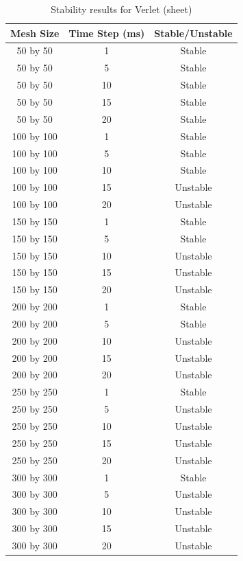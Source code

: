 \begin{table}[tp]
   \begin{minipage}{\textwidth}
      \begin{center}
         \begin{tabular}{c|c|c}
           Mesh Size & Time Step (ms) & Stable/Unstable\\
           \hline
           50 by 50 & 1 & Stable\\
           50 by 50 & 5 & Stable\\
           50 by 50 & 10 & Stable\\
           50 by 50 & 15 & Stable\\
           50 by 50 & 20 & Stable\\
           100 by 100 & 1 & Stable\\
           100 by 100 & 5 & Stable\\
           100 by 100 & 10 & Stable\\
           100 by 100 & 15 & Unstable\\
           100 by 100 & 20 & Unstable\\           
           150 by 150 & 1 & Stable\\
           150 by 150 & 5 & Stable\\
           150 by 150 & 10 & Unstable\\
           150 by 150 & 15 & Unstable\\
           150 by 150 & 20 & Unstable\\           
           200 by 200 & 1 & Stable\\
           200 by 200 & 5 & Stable\\
           200 by 200 & 10 & Unstable\\
           200 by 200 & 15 & Unstable\\
           200 by 200 & 20 & Unstable\\           
           250 by 250 & 1 & Stable\\
           250 by 250 & 5 & Unstable\\
           250 by 250 & 10 & Unstable\\
           250 by 250 & 15 & Unstable\\
           250 by 250 & 20 & Unstable\\           
           300 by 300 & 1 & Stable\\
           300 by 300 & 5 & Unstable\\
           300 by 300 & 10 & Unstable\\
           300 by 300 & 15 & Unstable\\
           300 by 300 & 20 & Unstable\\
         \end{tabular}
      \end{center}
   \end{minipage}
   \caption{Stability results for Verlet (sheet)}
   \label{tab:v stability sheet}
\end{table}

